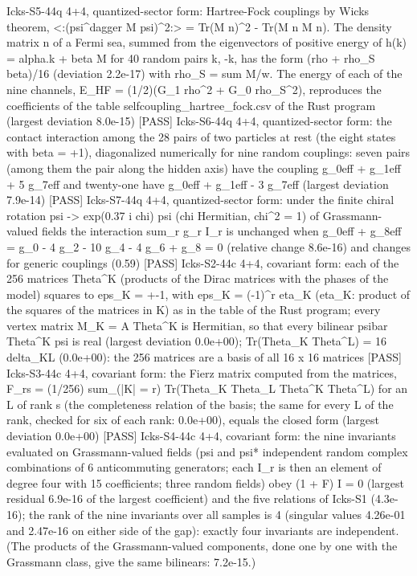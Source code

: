 \documentclass[
  10pt,
]{article}
\newenvironment{Shaded}{}{}
\newcommand{\NormalTok}[1]{#1}
\begin{document}
\begin{Shaded}
\begin{Highlighting}[]
\NormalTok{[PASS] Icks{-}S5{-}44q  4+4, quantized{-}sector form: Hartree{-}Fock couplings by Wick\textquotesingle{}s theorem, \textless{}:(psi\^{}dagger M psi)\^{}2:\textgreater{} = Tr(M n)\^{}2 {-} Tr(M n M n). The density matrix n of a Fermi sea, summed from the eigenvectors of positive energy of h(k) = alpha.k + beta M for 40 random pairs k, {-}k, has the form (rho + rho\_S beta)/16 (deviation 2.2e{-}17) with rho\_S = sum M/w. The energy of each of the nine channels, E\_HF = (1/2)(G\_1 rho\^{}2 + G\_0 rho\_S\^{}2), reproduces the coefficients of the table selfcoupling\_hartree\_fock.csv of the Rust program (largest deviation 8.0e{-}15)}
\NormalTok{[PASS] Icks{-}S6{-}44q  4+4, quantized{-}sector form: the contact interaction among the 28 pairs of two particles at rest (the eight states with beta = +1), diagonalized numerically for nine random couplings: seven pairs (among them the pair along the hidden axis) have the coupling g\_0eff + g\_1eff + 5 g\_7eff and twenty{-}one have g\_0eff + g\_1eff {-} 3 g\_7eff (largest deviation 7.9e{-}14)}
\NormalTok{[PASS] Icks{-}S7{-}44q  4+4, quantized{-}sector form: under the finite chiral rotation psi {-}\textgreater{} exp(0.37 i chi) psi (chi Hermitian, chi\^{}2 = 1) of Grassmann{-}valued fields the interaction sum\_r g\_r I\_r is unchanged when g\_0eff + g\_8eff = g\_0 {-} 4 g\_2 {-} 10 g\_4 {-} 4 g\_6 + g\_8 = 0 (relative change 8.6e{-}16) and changes for generic couplings (0.59)}
\NormalTok{[PASS] Icks{-}S2{-}44c  4+4, covariant form: each of the 256 matrices Theta\^{}K (products of the Dirac matrices with the phases of the model) squares to eps\_K = +{-}1, with eps\_K = ({-}1)\^{}r eta\_K (eta\_K: product of the squares of the matrices in K) as in the table of the Rust program; every vertex matrix M\_K = A Theta\^{}K is Hermitian, so that every bilinear psibar Theta\^{}K psi is real (largest deviation 0.0e+00); Tr(Theta\_K Theta\^{}L) = 16 delta\_KL (0.0e+00): the 256 matrices are a basis of all 16 x 16 matrices}
\NormalTok{[PASS] Icks{-}S3{-}44c  4+4, covariant form: the Fierz matrix computed from the matrices, F\_rs = (1/256) sum\_(|K| = r) Tr(Theta\_K Theta\_L Theta\^{}K Theta\^{}L) for an L of rank s (the completeness relation of the basis; the same for every L of the rank, checked for six of each rank: 0.0e+00), equals the closed form (largest deviation 0.0e+00)}
\NormalTok{[PASS] Icks{-}S4{-}44c  4+4, covariant form: the nine invariants evaluated on Grassmann{-}valued fields (psi and psi* independent random complex combinations of 6 anticommuting generators; each I\_r is then an element of degree four with 15 coefficients; three random fields) obey (1 + F) I = 0 (largest residual 6.9e{-}16 of the largest coefficient) and the five relations of Icks{-}S1 (4.3e{-}16); the rank of the nine invariants over all samples is 4 (singular values 4.26e{-}01 and 2.47e{-}16 on either side of the gap): exactly four invariants are independent. (The products of the Grassmann{-}valued components, done one by one with the Grassmann class, give the same bilinears: 7.2e{-}15.)}

\end{Highlighting}
\end{Shaded}
\end{document}
